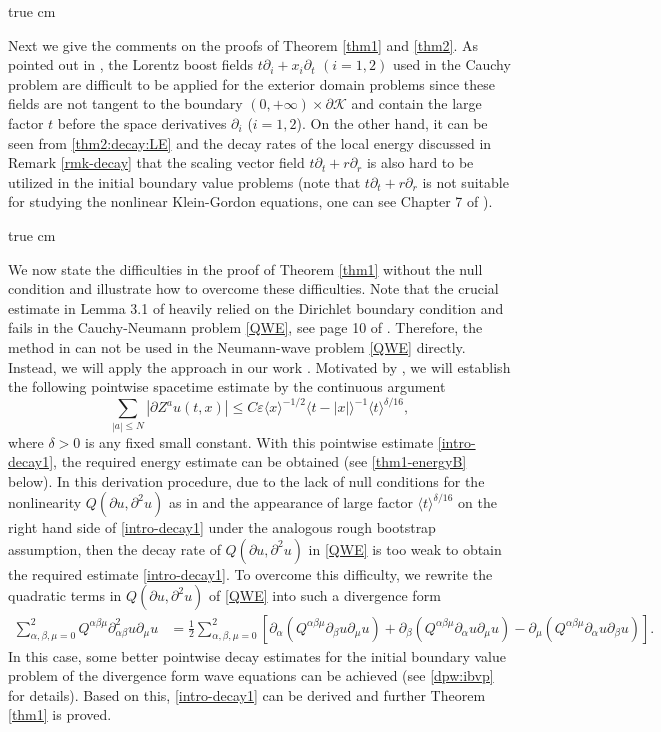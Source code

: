 \documentclass[11pt,twoside]{article}
\def\cK{\mathcal K}
\def\p{\partial}
\def\ve{\varepsilon}
\newcommand{\w}[1]{\langle {#1} \rangle}
\theoremstyle{plain}
\theoremstyle{definition}
\numberwithin{equation}{section}
\begin{document}
 true cm

Next we give the comments on the proofs of Theorem \ref{thm1} and \ref{thm2}.
As pointed out in \cite[page 110]{KSS04}, the Lorentz boost fields $t\p_i+x_i\p_t$ $(i=1,2)$ used in the Cauchy
problem are difficult to be applied for the exterior domain problems since these fields are not tangent to the boundary
$(0,+\infty)\times\p\cK$ and contain the large factor $t$ before the space derivatives $\p_i$ ($i=1,2$).
On the other hand, it can be seen from \eqref{thm2:decay:LE} and the decay rates of the local energy discussed in Remark \ref{rmk-decay} that the scaling vector field $t\p_t+r\p_r$ is also hard to be utilized in the initial boundary value problems
(note that $t\p_t+r\p_r$ is not suitable for studying the nonlinear Klein-Gordon equations, one can see Chapter 7 of \cite{Hormander97book}).

 true cm

We now state the difficulties in the proof of Theorem \ref{thm1} without the null condition and illustrate
how to overcome these difficulties.
Note that the crucial estimate in Lemma 3.1 of \cite{LRX25} heavily relied on the Dirichlet boundary condition and
fails in the Cauchy-Neumann problem \eqref{QWE}, see page 10 of \cite{LRX25}.
Therefore, the method in \cite{LRX25} can not be used in the Neumann-wave problem \eqref{QWE} directly.
Instead, we will apply the approach in our work \cite{HouYinYuan24}.
Motivated by \cite{HouYinYuan24}, we will establish the following pointwise spacetime estimate
by the continuous argument
\begin{equation}\label{intro-decay1}
\sum_{|a|\le N}|\p Z^au(t,x)|\le C\ve\w{x}^{-1/2}\w{t-|x|}^{-1}\w{t}^{\delta/16},
\end{equation}
where $\delta>0$ is any fixed small constant.
With this pointwise estimate \eqref{intro-decay1}, the required energy estimate can be obtained (see \eqref{thm1-energyB} below).
In this derivation procedure, due to the lack of null conditions for the nonlinearity  $Q(\p u,\p^2u)$ as in \cite{HouYinYuan24}
and the appearance of large factor $\w{t}^{\delta/16}$ on the right hand side of \eqref{intro-decay1} under the analogous
rough bootstrap assumption,
then the decay rate of $Q(\p u,\p^2u)$ in \eqref{QWE}
is too weak to obtain the required estimate \eqref{intro-decay1}.
To overcome this difficulty, we rewrite the quadratic terms in $Q(\p u,\p^2u)$ of \eqref{QWE} into such a divergence form
\begin{equation*}
\begin{split}
\sum_{\alpha,\beta,\mu=0}^2Q^{\alpha\beta\mu}\p^2_{\alpha\beta}u\p_{\mu}u
&=\frac12\sum_{\alpha,\beta,\mu=0}^2[\p_{\alpha}(Q^{\alpha\beta\mu}\p_{\beta}u\p_{\mu}u)+\p_{\beta}(Q^{\alpha\beta\mu}\p_{\alpha}u\p_{\mu}u)
-\p_{\mu}(Q^{\alpha\beta\mu}\p_{\alpha}u\p_{\beta}u)].
\end{split}
\end{equation*}
In this case, some better pointwise decay estimates for the initial boundary value problem of the divergence form wave equations can be
achieved (see \eqref{dpw:ibvp} for details). Based on this, \eqref{intro-decay1} can be
derived and further Theorem \ref{thm1} is proved.
\end{document}
